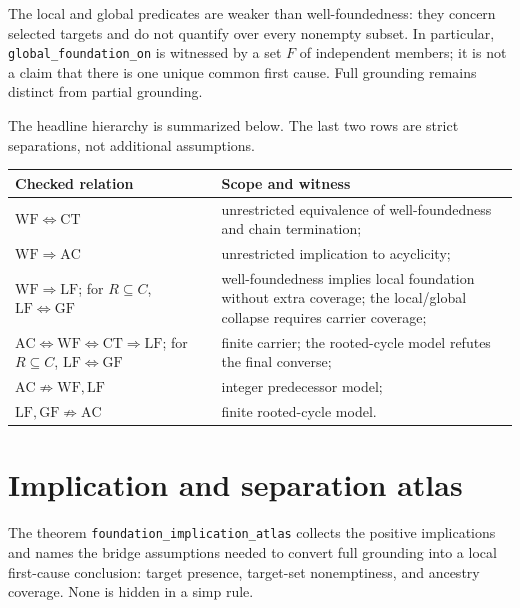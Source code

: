 \documentclass[11pt,a4paper]{article}
\begin{document}
The local and global predicates are weaker than well-foundedness: they concern
selected targets and do not quantify over every nonempty subset.  In particular,
\texttt{global\_foundation\_on} is witnessed by a set \(F\) of independent
members; it is not a claim that there is one unique common first cause.  Full
grounding remains distinct from partial grounding.

The headline hierarchy is summarized below.  The last two rows are strict
separations, not additional assumptions.

\begin{center}
\small
\begin{tabular}{@{}p{.38\linewidth}p{.52\linewidth}@{}}
\toprule
\textbf{Checked relation} & \textbf{Scope and witness} \\
\midrule
\(\mathrm{WF}\Longleftrightarrow\mathrm{CT}\) & unrestricted equivalence of
  well-foundedness and chain termination; \\
\(\mathrm{WF}\Longrightarrow\mathrm{AC}\) & unrestricted implication to
  acyclicity; \\
\(\mathrm{WF}\Longrightarrow\mathrm{LF}\); for \(R\subseteq C\),
  \(\mathrm{LF}\Longleftrightarrow\mathrm{GF}\) &
  well-foundedness implies local foundation without extra coverage; the
  local/global collapse requires carrier coverage; \\
\(\mathrm{AC}\Longleftrightarrow\mathrm{WF}\Longleftrightarrow\mathrm{CT}
  \Longrightarrow\mathrm{LF}\); for \(R\subseteq C\),
  \(\mathrm{LF}\Longleftrightarrow\mathrm{GF}\) &
  finite carrier; the rooted-cycle model refutes the final converse; \\
\(\mathrm{AC}\not\Longrightarrow\mathrm{WF},\mathrm{LF}\) & integer
  predecessor model; \\
\(\mathrm{LF},\mathrm{GF}\not\Longrightarrow\mathrm{AC}\) & finite
  rooted-cycle model. \\
\bottomrule
\end{tabular}
\end{center}

\section{Implication and separation atlas}

The theorem \texttt{foundation\_implication\_atlas} collects the positive
implications and names the bridge assumptions needed to convert full grounding
into a local first-cause conclusion: target presence, target-set nonemptiness,
and ancestry coverage.  None is hidden in a simp rule.
\end{document}
